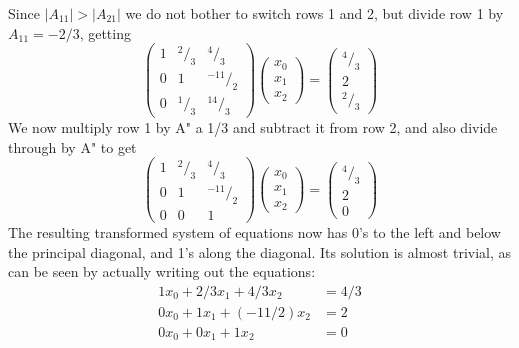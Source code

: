 Since $|A_{11}| > |A_{21}|$ we do not bother to switch rows 1 and 2, but
divide row 1 by $A_{11} =-2/3$, getting
\begin{equation}
    \begin{pmatrix}
        1 & ^2/_3 & ^4/_3\\ 
        0 & 1 & ^{-11}/_2\\ 
        0 & ^1/_3 & ^{14}/_3
    \end{pmatrix}
    \begin{pmatrix}
        x_0\\
        x_1\\
        x_2
    \end{pmatrix}
    =
    \begin{pmatrix}
        ^4/_3\\
        2\\
        ^2/_3
    \end{pmatrix}
\end{equation}
We now multiply row 1 by A" a 1/3 and subtract it from row 2,
and also divide through by A" to get
\begin{equation}
    \begin{pmatrix}
        1 & ^2/_3 & ^4/_3\\ 
        0 & 1 & ^{-11}/_2\\ 
        0 & 0 & 1
    \end{pmatrix}
    \begin{pmatrix}
        x_0\\
        x_1\\
        x_2
    \end{pmatrix}
    =
    \begin{pmatrix}
        ^4/_3\\
        2\\
        0
    \end{pmatrix}
\end{equation}
The resulting transformed system of equations now has 0's to the
left and below the principal diagonal, and 1's along the diagonal.
Its solution is almost trivial, as can be seen by actually writing out
the equations:
\begin{subequations}
    \begin{align}
         \label{eq:09_21_0}
        1 x_0 + 2/3 x_1 + 4/3 x_2 &= 4/3\\
         \label{eq:09_21_1}
        0 x_0 + 1 x_1 + (-11/2) x_2 &= 2 \\
        0 x_0 + 0 x_1 + 1 x_2 &= 0 \label{eq:09_21_2}
    \end{align} 
\end{subequations}
